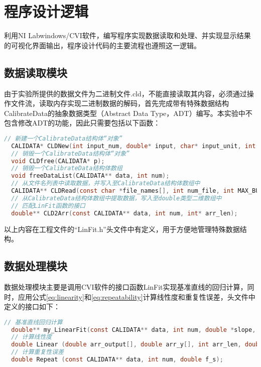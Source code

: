 \documentclass[a4paper,12pt,twoside]{article}%
\begin{document}
\section{程序设计逻辑}
利用NI Labwindows/CVI软件，编写程序实现数据读取和处理、并实现显示结果的可视化界面输出，程序设计代码的主要流程也遵照这一逻辑。
\subsection{数据读取模块}
由于实验所提供的数据文件为二进制文件.cld，不能直接读取其内容，必须通过操作文件流，读取内存实现二进制数据的解码，首先完成带有特殊数据结构CalibrateData的抽象数据类型（Abstract Data Type，ADT）编写。本实验中不包含修改ADT的功能，因此只需要包括以下函数：
\begin{lstlisting}[language=C]
  // 新建一个CalibrateData结构体“对象”
  CALIDATA* CLDNew(int input_num, double* input, char* input_unit, int loop_num, char* output_unit, double* output);
  // 销毁一个CalibrateData结构体“对象”
  void CLDfree(CALIDATA* p);
  // 销毁一个CalibrateData结构体数组
  void freeDataList(CALIDATA** data, int num);
  // 从文件名列表中读取数据，并写入至CalibrateData结构体数组中
  CALIDATA** CLDRead(const char *file_names[], int num_file, int MAX_BUFFER);
  // 从CalibrateData结构体数组中提取数据，写入至double类型二维数组中
  // 匹配LinFit函数的接口
  double** CLD2Arr(const CALIDATA** data, int num, int* arr_len);
\end{lstlisting}\par
以上内容在工程文件的“LinFit.h”头文件中有定义，用于方便地管理特殊数据结构。
\subsection{数据处理模块}
数据处理模块主要是调用CVI软件的接口函数LinFit实现基准直线的回归计算，同时，应用公式\ref{eq:linearity}和\ref{eq:repeatability}计算线性度和重复性误差，头文件中定义的接口如下：
\begin{lstlisting}[language=C]
  // 基准直线回归计算
  double** my_LinearFit(const CALIDATA** data, int num, double *slope, double *intercept, double *meanSquaredError, double *linear, double *repeat, int *arr_len);
  // 计算线性度
  double Linear (double arr_output[], double arr_y[], int arr_len, double f_s);
  // 计算重复性误差
  double Repeat (const CALIDATA** data, int num, double f_s);
\end{lstlisting}
\end{document}
